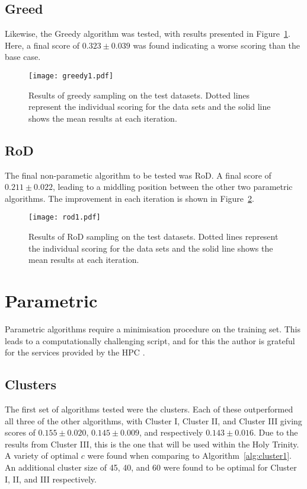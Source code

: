 \subsection{Greed}
Likewise, the Greedy algorithm was tested, with results presented in Figure~\ref{fig:GreedyTestSet}. Here, a final score of ${0.323\pm{}0.039}$ was found indicating a worse scoring than the base case.
\begin{figure}[H]
  \begin{center}
    \texttt{[image: greedy1.pdf]}
    \caption[Greedy]{Results of greedy sampling on the test datasets. Dotted lines represent the individual scoring for the data sets and the solid line shows the mean results at each iteration.}
    \label{fig:GreedyTestSet}
  \end{center}
\end{figure}

\subsection[Region of Disagreement]{RoD}
The final non-parametic algorithm to be tested was RoD. A final score of ${0.211\pm{}0.022}$, leading to a middling position between the other two parametric algorithms. The improvement in each iteration is shown in Figure~\ref{fig:RODTestSet}.

\begin{figure}[H]
  \begin{center}
    \texttt{[image: rod1.pdf]}
    \caption[RoD]{Results of RoD sampling on the test datasets. Dotted lines represent the individual scoring for the data sets and the solid line shows the mean results at each iteration.}
    \label{fig:RODTestSet}
  \end{center}
\end{figure}

\section{Parametric}
Parametric algorithms require a minimisation procedure on the training set. This leads to a computationally challenging script, and for this the author is grateful for the services provided by the HPC \cite{HPC}.

\subsection{Clusters}
The first set of algorithms tested were the clusters. Each of these outperformed all three of the other algorithms, with Cluster I, Cluster II, and Cluster III giving scores of ${0.155\pm{}0.020}$, ${0.145\pm{}0.009}$, and respectively ${0.143\pm{}0.016}$. Due to the results from Cluster III, this is the one that will be used within the Holy Trinity. A variety of optimal ${c}$ were found when comparing to Algorithm~\ref{alg:cluster1}. An additional cluster size of 45, 40, and 60 were found to be optimal for Cluster I, II, and III respectively.


